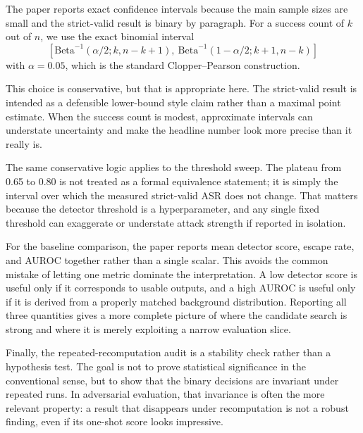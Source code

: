 The paper reports exact confidence intervals because the main sample sizes are small and the strict-valid result is binary by paragraph. For a success count of $k$ out of $n$, we use the exact binomial interval
\[
[\mathrm{Beta}^{-1}(\alpha/2; k, n-k+1),\ \mathrm{Beta}^{-1}(1-\alpha/2; k+1, n-k)]
\]
with $\alpha=0.05$, which is the standard Clopper--Pearson construction.

This choice is conservative, but that is appropriate here. The strict-valid result is intended as a defensible lower-bound style claim rather than a maximal point estimate. When the success count is modest, approximate intervals can understate uncertainty and make the headline number look more precise than it really is.

The same conservative logic applies to the threshold sweep. The plateau from 0.65 to 0.80 is not treated as a formal equivalence statement; it is simply the interval over which the measured strict-valid ASR does not change. That matters because the detector threshold is a hyperparameter, and any single fixed threshold can exaggerate or understate attack strength if reported in isolation.

For the baseline comparison, the paper reports mean detector score, escape rate, and AUROC together rather than a single scalar. This avoids the common mistake of letting one metric dominate the interpretation. A low detector score is useful only if it corresponds to usable outputs, and a high AUROC is useful only if it is derived from a properly matched background distribution. Reporting all three quantities gives a more complete picture of where the candidate search is strong and where it is merely exploiting a narrow evaluation slice.

Finally, the repeated-recomputation audit is a stability check rather than a hypothesis test. The goal is not to prove statistical significance in the conventional sense, but to show that the binary decisions are invariant under repeated runs. In adversarial evaluation, that invariance is often the more relevant property: a result that disappears under recomputation is not a robust finding, even if its one-shot score looks impressive.
